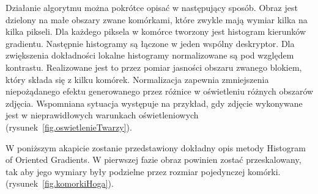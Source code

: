 \documentclass[a4paper,twoside,12pt]{book}
\begin{document}
    Działanie algorytmu można pokrótce opisać w następujący sposób. Obraz jest dzielony na małe obszary zwane komórkami, które zwykle mają wymiar kilka na kilka pikseli.
    Dla każdego piksela w komórce tworzony jest histogram kierunków gradientu.
    Następnie histogramy są łączone w jeden wspólny deskryptor.
    Dla zwiększenia dokładności lokalne histogramy normalizowane są pod względem kontrastu.
    Realizowane jest to przez pomiar jasności obszaru zwanego blokiem, który
    składa się z kilku komórek. Normalizacja zapewnia zmniejszenia niepożądanego efektu generowanego przez
    różnice w oświetleniu różnych obszarów zdjęcia. Wspomniana sytuacja występuje na przykład, gdy zdjęcie wykonywane
    jest w nieprawidłowych warunkach oświetleniowych (rysunek~\ref{fig.oswietlenieTwarzy}).

    W poniższym akapicie zostanie przedstawiony dokładny opis metody Histogram of Oriented Gradients.
    W pierwszej fazie obraz powinien zostać przeskalowany, tak aby jego wymiary były podzielne przez rozmiar
    pojedynczej komórki.
    (rysunek~\ref{fig.komorkiHoga}).
\end{document}
